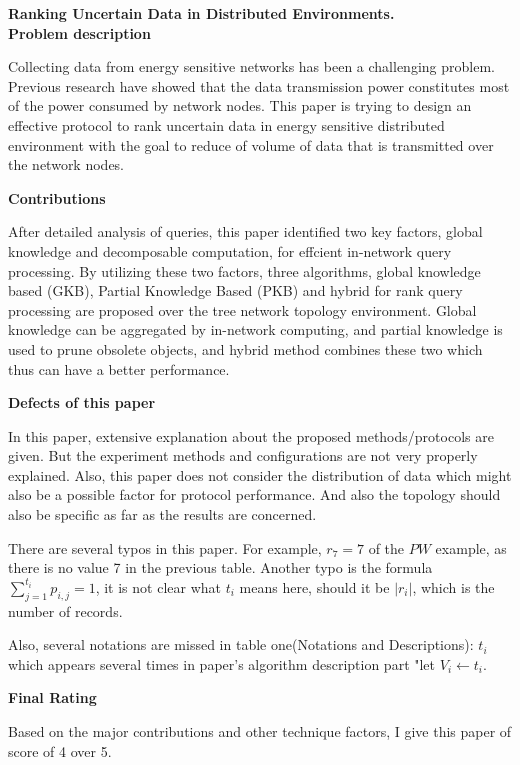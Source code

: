 \documentclass[16pt]{report}
\begin{document}
\textbf{\Large{Ranking Uncertain Data in Distributed Environments.}} \\ 

\textbf{Problem description}

Collecting data from energy sensitive networks has been a challenging
problem. Previous research have showed that the data transmission power
constitutes most of the power consumed by network nodes. This paper is
trying to design an effective protocol to rank uncertain data in
energy sensitive distributed environment with the goal to reduce of
volume of data that is transmitted over the network nodes.

\textbf{Contributions}

After detailed analysis of queries, this paper identified two key
factors, global knowledge and decomposable computation, for effcient
in-network query processing. By utilizing these two factors, three
algorithms, global knowledge based (GKB), Partial Knowledge Based
(PKB) and hybrid for rank query processing are proposed over the tree
network topology environment. Global knowledge can be aggregated by
in-network computing, and partial knowledge is used to prune obsolete
objects, and hybrid method combines these two which thus can have a
better performance. 

\textbf{Defects of this paper} 

In this paper, extensive explanation about the proposed
methods/protocols are given. But the experiment methods and
configurations are not very properly explained. Also, this paper does
not consider the distribution of data which might also be a possible
factor for protocol performance. And also the topology should also be
specific as far as the results are concerned. 

There are several typos in this paper. For example, $r_7 = 7$ of the
$PW$ example, as there is no value 7 in the previous table. Another
typo is the formula $\sum_{j=1}^{t_i}p_{i,j} = 1$, it is not clear
what $t_i$ means here, should it be $|r_i|$, which is the number of
records. 

Also, several notations are missed in table one(Notations and Descriptions):
$t_i$ which appears several times in paper's algorithm description
part "let $V_i \leftarrow t_i$.

\textbf{Final Rating}

Based on the major contributions and other technique factors, I give
this paper of score of 4 over 5. 
\end{document}
